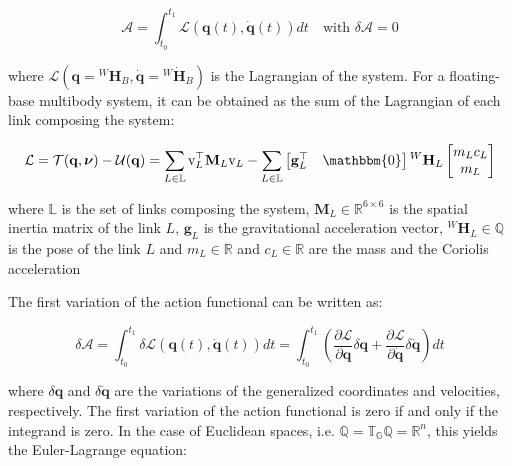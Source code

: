 \begin{equation}
    \mathcal{A} = \int _{t _0} ^{t _1} \mathcal{L} (\mathbf{q}(t), \mathbf{\dot{q}}(t)) dt \quad \text{with } \delta \mathcal{A} = 0
\end{equation}

where $\mathcal{L} (\mathbf{q} = {}^W\mathbf{H} _B, \dot{\mathbf{q}} = {}^W\dot{\mathbf{H}} _B)$ is the Lagrangian of the system. For a floating-base multibody system, it can be obtained as the sum of the Lagrangian of each link composing the system:

\begin{equation}
    \mathcal{L} = \mathcal{T}(\mathbf{q},\boldsymbol{\nu}) - \mathcal{U}(\mathbf{q}) = \sum _{L \in \mathbb{L}} \mathrm{v} ^\top _L \mathbf{M} _L \mathrm{v} _L - \sum _{L \in \mathbb{L}} \begin{bmatrix}
        \mathbf{g} ^\top _L & \mathbbm{0}
    \end{bmatrix} {}^W\mathbf{H} _L
    \begin{bmatrix}
        m _L c _L \\ m _L
    \end{bmatrix}
\end{equation}

where $\mathbb{L}$ is the set of links composing the system, $\mathbf{M} _L \in \mathbb{R} ^{6 \times 6}$ is the spatial inertia matrix of the link $L$, $\mathbf{g} _L$ is the gravitational acceleration vector, ${}^W\mathbf{H} _L \in \mathbb{Q}$ is the pose of the link $L$ and $m _L \in \mathbb{R}$ and $c _L \in \mathbb{R}$ are the mass and the Coriolis acceleration

The first variation of the action functional can be written as:

\begin{equation}
    \delta \mathcal{A} = \int _{t _0} ^{t _1} \delta \mathcal{L} (\mathbf{q}(t), \mathbf{\dot{q}}(t))dt = \int _{t _0} ^{t _1} \left( \frac{\partial \mathcal{L}}{\partial \mathbf{q}} \delta \mathbf{q} + \frac{\partial \mathcal{L}}{\partial \mathbf{\dot{q}}} \delta \mathbf{\dot{q}} \right) dt
\end{equation}

where $\delta \mathbf{q}$ and $\delta \mathbf{\dot{q}}$ are the variations of the generalized coordinates and velocities, respectively. The first variation of the action functional is zero if and only if the integrand is zero. In the case of Euclidean spaces, i.e. $\mathbb{Q} = \mathbb{T} _{\mathbb{G}}\mathbb{Q} =\mathbb{R} ^n$, this yields the Euler-Lagrange equation:

